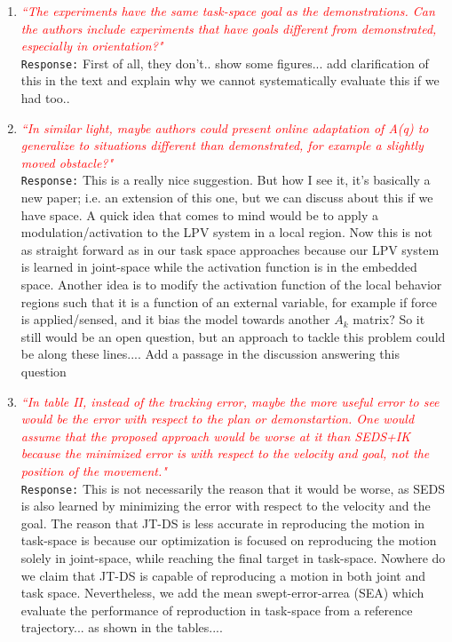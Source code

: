 \documentclass{article}
\begin{document}
\begin{enumerate}
\item \textcolor{red}{\textit{``The experiments have the same task-space goal as the
demonstrations. Can the authors include experiments that have goals
different from demonstrated, especially in orientation?"}}\\
\texttt{Response:} \small First of all, they don't.. show some figures... add clarification of this in the text and explain why we cannot systematically evaluate this if we had too..\\

\item \textcolor{red}{\textit{``In similar light, maybe authors could present online adaptation of
A(q) to generalize to situations different than demonstrated, for
example a slightly moved obstacle?"}}\\
\texttt{Response:} \small This is a really nice suggestion. But how I see it, it's basically a new paper; i.e. an extension of this one, but we can discuss about this if we have space. A quick idea that comes to mind would be to apply a modulation/activation to the LPV system in a local region. Now this is not as straight forward as in our task space approaches because our LPV system is learned in joint-space while the activation function is in the embedded space. Another idea is to modify the activation function of the local behavior regions such that it is a function of an external variable, for example if force is applied/sensed, and it bias the model towards another $A_k$ matrix? So it still would be an open question, but an approach to tackle this problem could be along these lines.... Add a passage in the discussion answering this question\\

\item \textcolor{red}{\textit{``In table II, instead of the tracking error, maybe the more useful
error to see would be the error with respect to the plan or
demonstartion. One would assume that the proposed approach would be
worse at it than SEDS+IK because the minimized error is with respect to
the velocity and goal, not the position of the movement."}}\\
\texttt{Response:} \small This is not necessarily the reason that it would be worse, as SEDS is also learned by minimizing the error with respect to
the velocity and the goal. The reason that JT-DS is less accurate in reproducing the motion in task-space is because our optimization is focused on reproducing the motion solely in joint-space, while reaching the final target in task-space. Nowhere do we claim that JT-DS is capable of reproducing a motion in both joint and task space. Nevertheless, we add the mean swept-error-arrea (SEA) which evaluate the performance of reproduction in task-space from a reference trajectory... as shown in the tables....\\
\end{enumerate}
\end{document}
